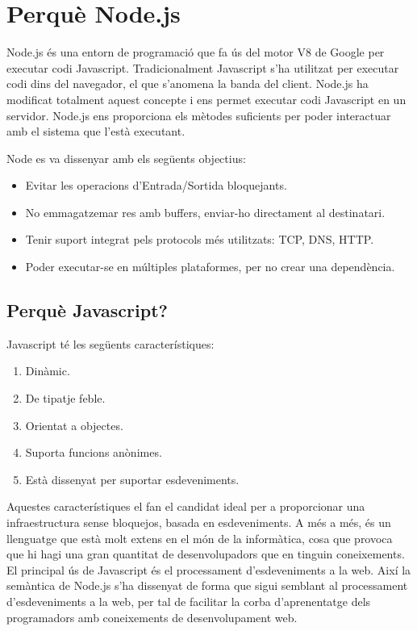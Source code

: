 \chapter{Perquè Node.js}
\label{sec:Node.js-full}

Node.js és una entorn de programació que fa ús del motor V8 de Google per executar codi Javascript. Tradicionalment Javascript s'ha utilitzat per executar codi dins del navegador, el que s'anomena la banda del client. Node.js ha modificat totalment aquest concepte i ens permet executar codi Javascript en un servidor. Node.js ens proporciona els mètodes suficients per poder interactuar amb el sistema que l'està executant.

Node es va dissenyar amb els següents objectius: 

\begin{itemize}
    \item{Evitar les operacions d'Entrada/Sortida bloquejants.}
    \item{No emmagatzemar res amb buffers, enviar-ho directament al destinatari.}
    \item{Tenir suport integrat pels protocols més utilitzats: TCP, DNS, HTTP.}
    \item{Poder executar-se en múltiples plataformes, per no crear una dependència.}
\end{itemize}

\section{Perquè Javascript?}

Javascript té les següents característiques: 

\begin{enumerate}
    \item{Dinàmic.}
    \item{De tipatje feble.}
    \item{Orientat a objectes.}
    \item{Suporta funcions anònimes.}
    \item{Està dissenyat per suportar esdeveniments.}
\end{enumerate}

Aquestes característiques el fan el candidat ideal per a proporcionar una infraestructura sense bloquejos, basada en esdeveniments. A més a més, és un llenguatge que està molt extens en el món de la informàtica, cosa que provoca que hi hagi una gran quantitat de desenvolupadors que en tinguin coneixements. El principal ús de Javascript és el processament d'esdeveniments a la web. Així la semàntica de Node.js s'ha dissenyat de forma que sigui semblant al processament d'esdeveniments a la web, per tal de facilitar la corba d'aprenentatge dels programadors amb coneixements de desenvolupament web.

